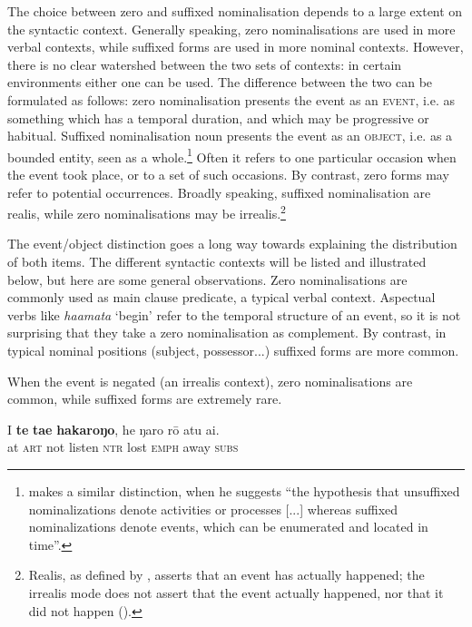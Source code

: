 The choice between zero and suffixed nominalisation depends to a large extent on the syntactic context. Generally speaking, zero nominalisations are used in more verbal contexts, while suffixed forms are used in more nominal contexts. However, there is no clear watershed between the two sets of contexts: in certain environments either one can be used. The difference between the two can be formulated as follows: zero nominalisation presents the event as an \textsc{event}, i.e. as something which has a temporal duration, and which may be progressive or habitual. Suffixed nominalisation noun presents the event as an \textsc{object}, i.e. as a bounded entity, seen as a whole.\footnote{\label{fn:105}\citet[79]{Clark1981} makes a similar distinction, when he suggests “the hypothesis that unsuffixed nominalizations denote activities or processes [...] whereas suffixed nominalizations denote events, which can be enumerated and located in time”.} Often it refers to one particular occasion when the event took place, or to a set of such occasions. By contrast, zero forms may refer to potential occurrences. Broadly speaking, suffixed nominalisation are realis, while zero nominalisations may be irrealis.\footnote{\label{fn:106}Realis, as defined by \citet[244]{Payne1997}, asserts that an event has actually happened; the irrealis mode does not assert that the event actually happened, nor that it did not happen ().}

The event/object distinction goes a long way towards explaining the distribution of both items. The different syntactic contexts will be listed and illustrated below, but here are some general observations. Zero nominalisations are commonly used as main clause predicate, a typical verbal context. Aspectual verbs like \textit{ha{\ꞌ}amata} ‘begin’ refer to the temporal structure of an event, so it is not surprising that they take a zero nominalisation as complement. By contrast, in typical nominal positions (subject, possessor...) suffixed forms are more common. 

When the event is negated (an irrealis context), zero nominalisations are common, while suffixed forms are extremely rare. 

\ea\label{ex:3.17}
\gll {\ꞌ}I \textbf{te} \textbf{ta{\ꞌ}e} \textbf{hakaroŋo}, he ŋaro rō atu {\ꞌ}ai. \\
at \textsc{art} not listen \textsc{ntr} lost \textsc{emph} away \textsc{subs} \\

